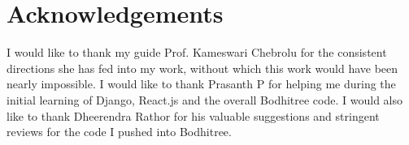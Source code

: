 \documentclass[12pt]{article}
\begin{document}

\newpage

\newpage

\newpage

\newpage

\newpage

\newpage

\newpage
%
%

\newpage
%
\section*{Acknowledgements}
I would like to thank my guide Prof. Kameswari Chebrolu for the consistent directions she has fed into my work, without which this work would have been nearly impossible. I would like to thank Prasanth P for helping me during the initial learning of Django, React.js and the overall Bodhitree code. I would also like to thank Dheerendra Rathor for his valuable suggestions and stringent reviews for the code I pushed into Bodhitree.
\newpage
%

%
%
\end{document}
